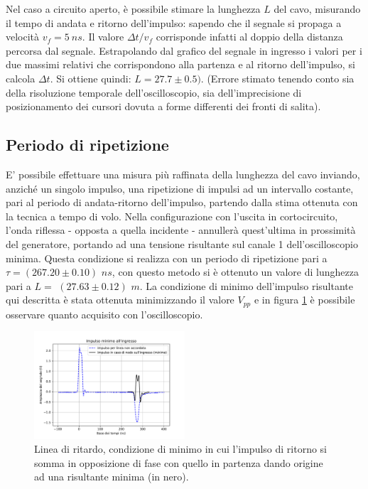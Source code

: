 \documentclass[journal]{IEEEtran}
\begin{document}
Nel caso a circuito aperto, è possibile stimare la lunghezza $L$ del cavo, misurando il tempo di andata e ritorno dell'impulso: sapendo che il segnale si propaga a velocità $v_f = 5 \ ns$. Il valore $\Delta t / {v_f}$ corrisponde infatti al doppio della distanza percorsa dal segnale. 
Estrapolando dal grafico del segnale in ingresso i valori per i due massimi relativi che corrispondono alla partenza e al ritorno dell'impulso, si calcola $\Delta t$. Si ottiene quindi: 
$L = 27.7 \pm 0.5)$. (Errore stimato tenendo conto sia della risoluzione temporale dell'oscilloscopio, sia dell'imprecisione di posizionamento dei cursori dovuta a forme differenti dei fronti di salita).



\subsection{Periodo di ripetizione}
E' possibile effettuare una misura più raffinata della lunghezza del cavo inviando, anziché un singolo impulso, una ripetizione di impulsi ad un intervallo costante, pari al periodo di andata-ritorno dell'impulso, partendo dalla stima ottenuta con la tecnica a tempo di volo. Nella configurazione con l'uscita in cortocircuito, l'onda riflessa - opposta a quella incidente - annullerà quest'ultima in prossimità del generatore, portando ad una tensione risultante sul canale 1 dell'oscilloscopio minima. Questa condizione si realizza con un periodo di ripetizione pari a $\tau = (267.20 \pm 0.10)$ $ns$, con questo metodo si è ottenuto un valore di lunghezza pari a $ L = $ $(27.63 \pm 0.12)$ $m $. La condizione di minimo dell'impulso risultante qui descritta è stata ottenuta minimizzando il valore $V_{pp}$ e in figura \ref{fig: ripetizione di impulsi} è possibile osservare quanto acquisito con l'oscilloscopio.

\begin{figure}[H]%
\begin{center}
\includegraphics[width=0.5\textwidth]{analysis/output/Delay_line_repetition.pdf}
\caption{Linea di ritardo, condizione di minimo in cui l'impulso di ritorno si somma in opposizione di fase con quello in partenza dando origine ad una risultante minima (in nero).}
\label{fig: ripetizione di impulsi}
\end{center}
\end{figure}
\end{document}
